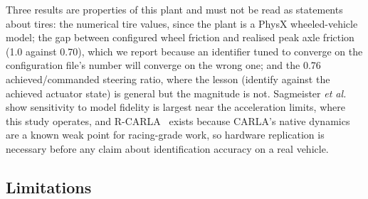 \documentclass[lineno,12pt]{sn-jnl}
\DeclareRobustCommand{\num}[1]{#1}
\theoremstyle{thmstyleone}%
\theoremstyle{thmstyletwo}%
\theoremstyle{thmstylethree}%
\begin{document}
Three results are properties of this plant and must not be read as statements
about tires: the numerical tire values, since the plant is a PhysX
wheeled-vehicle model; the gap between configured wheel friction and realised
peak axle friction (\num{1.0} against \num{0.70}), which we report because an
identifier tuned to converge on the configuration file's number will converge
on the wrong one; and the \num{0.76} achieved/commanded steering ratio, where
the lesson (identify against the achieved actuator state) is general but the
magnitude is not. Sagmeister
\emph{et al.}~\cite{simfidelity2026} show sensitivity to model fidelity is
largest near the acceleration limits, where this study operates, and
R-CARLA~\cite{rcarla2025} exists because CARLA's native dynamics are a known
weak point for racing-grade work, so hardware replication is necessary before
any claim about identification accuracy on a real vehicle.

\subsection{Limitations}
\label{subsec:limits}
\end{document}
